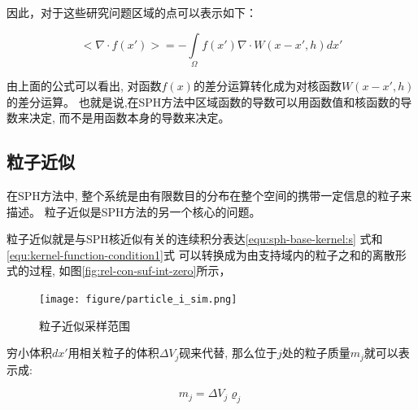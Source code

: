 因此，对于这些研究问题区域的点可以表示如下：

\begin{equation}
\label{equ:tmp2-15}
<\nabla{}\cdot{}f(x')> 
= -\int\limits_\Omega{}f(x')\nabla\cdot{}W(x-x',h)dx'
\end{equation}

由上面的公式可以看出,
对函数$f(x)$的差分运算转化成为对核函数$W(x-x',h)$的差分运算。
也就是说,在SPH方法中区域函数的导数可以用函数值和核函数的导数来决定,
而不是用函数本身的导数来决定。


\subsection{粒子近似}
在SPH方法中,
整个系统是由有限数目的分布在整个空间的携带一定信息的粒子来描述。
粒子近似是SPH方法的另一个核心的问题。

粒子近似就是与SPH核近似有关的连续积分表达\ref{equ:sph-base-kernel:s}
式和\ref{equ:kernel-function-condition1}式
可以转换成为由支持域内的粒子之和的离散形式的过程,
如图\ref{fig:rel-con-suf-int-zero}所示，
\begin{figure}[h!]
    \centering
    \texttt{[image: figure/particle\_i\_sim.png]}
    \caption{粒子近似采样范围}
    \label{fig-sub}
\end{figure}

穷小体积$dx'$用相关粒子的体积$\Delta{}V_j$砚来代替,
那么位于$j$处的粒子质量$m_j$就可以表示成:

\begin{equation}
\label{equ:tmp2-16}
m_j = \Delta{}V_j \varrho_j
\end{equation}

























